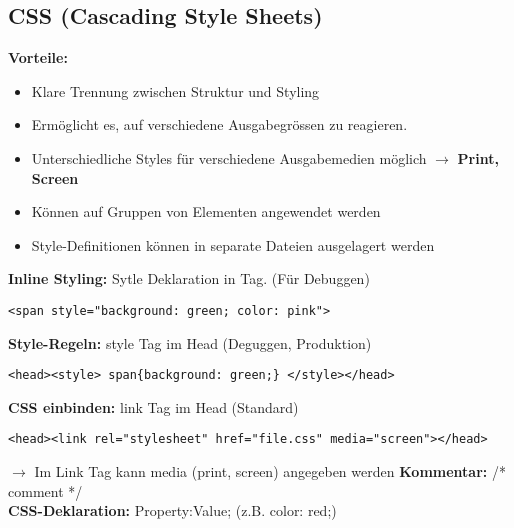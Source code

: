 \documentclass[7pt,landscape,a4paper]{scrartcl}
\begin{document}
\begin{multicols*}{4}
\section{CSS (Cascading Style Sheets)}
	\textcolor{b}{\textbf{Vorteile:}}
	\begin{itemize}[topsep=0pt, leftmargin=3mm]
		\setlength\itemsep{-0.3em}
		\item Klare Trennung zwischen Struktur und Styling
		\item Ermöglicht es, auf verschiedene Ausgabegrössen zu reagieren.
		\item Unterschiedliche Styles für verschiedene Ausgabemedien möglich
		$\rightarrow$ \textbf{Print, Screen}
		\item Können auf Gruppen von Elementen angewendet werden
		\item Style-Definitionen können in separate Dateien ausgelagert werden
	\end{itemize}
	\textcolor{b}{\textbf{Inline Styling:}} Sytle Deklaration in Tag. (Für Debuggen)
\begin{lstlisting}[style=htmlcssjs]
<span style="background: green; color: pink">
\end{lstlisting}
	\textcolor{b}{\textbf{Style-Regeln:}} style Tag im Head (Deguggen, Produktion)
\begin{lstlisting}[style=htmlcssjs]
<head><style> span{background: green;} </style></head>
\end{lstlisting}
	\textcolor{b}{\textbf{CSS einbinden:}} link Tag im Head (Standard)
\begin{lstlisting}[style=htmlcssjs]
<head><link rel="stylesheet" href="file.css" media="screen"></head>
\end{lstlisting}
	$\rightarrow$ Im Link Tag kann media (print, screen) angegeben werden
	\textcolor{b}{\textbf{Kommentar:}} /* comment */\\
	\textcolor{b}{\textbf{CSS-Deklaration:}} Property:Value; (z.B. color: red;)

\end{multicols*}
\end{document}
